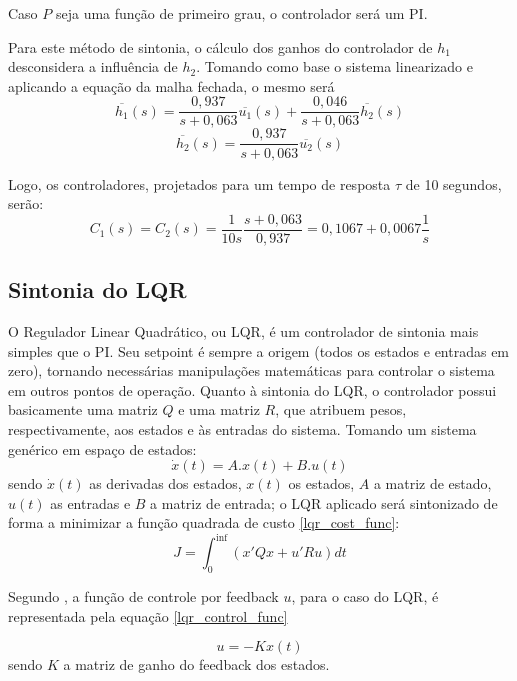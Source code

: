 Caso $P$ seja uma função de primeiro grau, o controlador será um PI.

Para este método de sintonia, o cálculo dos ganhos do controlador de $h_1$ desconsidera a influência de $h_2$. Tomando como base o sistema linearizado e aplicando a equação da malha fechada, o mesmo será
\begin{equation}
\overline{h_1}(s) = \frac{0,937}{s + 0,063} \overline{u_1}(s) + \frac{0,046}{s + 0,063} \overline{h_2}(s) 
\end{equation}
\begin{equation}
\overline{h_2}(s) = \frac{0,937}{s + 0,063} \overline{u_2}(s)
\end{equation}

Logo, os controladores, projetados para um tempo de resposta $\tau$ de 10 segundos, serão:
\begin{equation}
C_1(s) = C_2(s) = \frac{1}{10s} \frac{s + 0,063}{0,937} = 0,1067 + 0,0067 \frac{1}{s}
\end{equation}

\subsection{Sintonia do LQR}

O Regulador Linear Quadrático, ou LQR, é um controlador de sintonia mais simples que o PI. Seu setpoint é sempre a origem (todos os estados e entradas em zero), tornando necessárias manipulações matemáticas para controlar o sistema em outros pontos de operação. Quanto à sintonia do LQR, o controlador possui basicamente uma matriz $Q$ e uma matriz $R$, que atribuem pesos, respectivamente, aos estados e às entradas do sistema. Tomando um sistema genérico em espaço de estados:
\begin{equation}
\dot{x}(t) = A.x(t) + B.u(t)
\end{equation}
sendo $\dot{x}(t)$ as derivadas dos estados, $x(t)$ os estados, $A$ a matriz de estado, $u(t)$ as entradas e $B$ a matriz de entrada; o LQR aplicado será sintonizado de forma a minimizar a função quadrada de custo \ref{lqr_cost_func}:
\begin{equation}
J = \int_{0}^{\inf}(x'Qx + u'Ru)dt
\label{lqr_cost_func}
\end{equation} 

Segundo \cite{argentim2013}, a função de controle por feedback $u$, para o caso do LQR, é representada pela equação \ref{lqr_control_func}

\begin{equation}
u = -Kx(t)
\label{lqr_generic_control_func}
\end{equation}
sendo $K$ a matriz de ganho do feedback dos estados.

